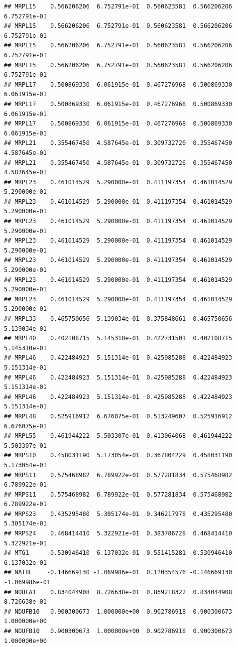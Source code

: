 \documentclass[
]{article}
\begin{document}
\begin{verbatim}
## MRPL15    0.566206206  6.752791e-01  0.560623581  0.566206206  6.752791e-01
## MRPL15    0.566206206  6.752791e-01  0.560623581  0.566206206  6.752791e-01
## MRPL15    0.566206206  6.752791e-01  0.560623581  0.566206206  6.752791e-01
## MRPL15    0.566206206  6.752791e-01  0.560623581  0.566206206  6.752791e-01
## MRPL17    0.500869330  6.061915e-01  0.467276968  0.500869330  6.061915e-01
## MRPL17    0.500869330  6.061915e-01  0.467276968  0.500869330  6.061915e-01
## MRPL17    0.500869330  6.061915e-01  0.467276968  0.500869330  6.061915e-01
## MRPL21    0.355467450  4.587645e-01  0.309732726  0.355467450  4.587645e-01
## MRPL21    0.355467450  4.587645e-01  0.309732726  0.355467450  4.587645e-01
## MRPL23    0.461014529  5.290000e-01  0.411197354  0.461014529  5.290000e-01
## MRPL23    0.461014529  5.290000e-01  0.411197354  0.461014529  5.290000e-01
## MRPL23    0.461014529  5.290000e-01  0.411197354  0.461014529  5.290000e-01
## MRPL23    0.461014529  5.290000e-01  0.411197354  0.461014529  5.290000e-01
## MRPL23    0.461014529  5.290000e-01  0.411197354  0.461014529  5.290000e-01
## MRPL23    0.461014529  5.290000e-01  0.411197354  0.461014529  5.290000e-01
## MRPL23    0.461014529  5.290000e-01  0.411197354  0.461014529  5.290000e-01
## MRPL33    0.465750656  5.139034e-01  0.375848661  0.465750656  5.139034e-01
## MRPL40    0.402108715  5.145310e-01  0.422731501  0.402108715  5.145310e-01
## MRPL46    0.422484923  5.151314e-01  0.425985288  0.422484923  5.151314e-01
## MRPL46    0.422484923  5.151314e-01  0.425985288  0.422484923  5.151314e-01
## MRPL46    0.422484923  5.151314e-01  0.425985288  0.422484923  5.151314e-01
## MRPL48    0.525916912  6.676075e-01  0.513249607  0.525916912  6.676075e-01
## MRPL55    0.461944222  5.503307e-01  0.413064068  0.461944222  5.503307e-01
## MRPS10    0.458031190  5.173054e-01  0.367804229  0.458031190  5.173054e-01
## MRPS11    0.575468982  6.789922e-01  0.577281834  0.575468982  6.789922e-01
## MRPS11    0.575468982  6.789922e-01  0.577281834  0.575468982  6.789922e-01
## MRPS23    0.435295480  5.305174e-01  0.346217978  0.435295480  5.305174e-01
## MRPS24    0.468414410  5.322921e-01  0.383786728  0.468414410  5.322921e-01
## MTG1      0.530946410  6.137032e-01  0.551415281  0.530946410  6.137032e-01
## NAT8L    -0.146669130 -1.069986e-01  0.120354576 -0.146669130 -1.069986e-01
## NDUFA1    0.834044908  8.726638e-01  0.869218322  0.834044908  8.726638e-01
## NDUFB10   0.900300673  1.000000e+00  0.902786918  0.900300673  1.000000e+00
## NDUFB10   0.900300673  1.000000e+00  0.902786918  0.900300673  1.000000e+00

\end{verbatim}
\end{document}

